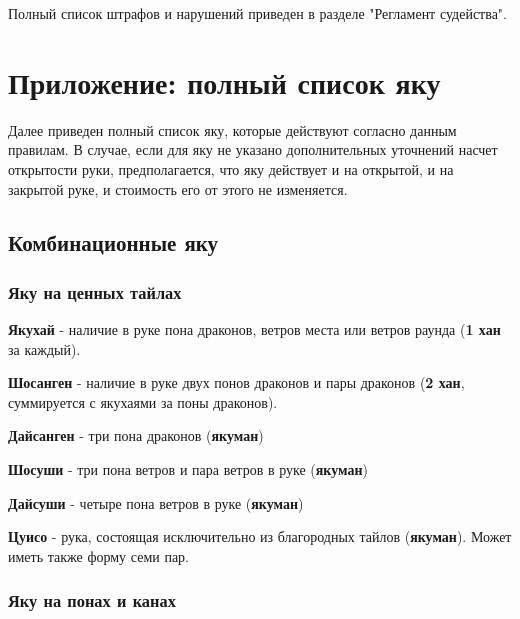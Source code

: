 Полный список штрафов и нарушений приведен в разделе "Регламент судейства".

\section{Приложение: полный список яку}

Далее приведен полный список яку, которые действуют согласно данным правилам. В случае, если для яку не указано дополнительных уточнений насчет открытости руки, предполагается, что яку действует и на открытой, и на закрытой руке, и стоимость его от этого не изменяется.

\subsection{Комбинационные яку}

\subsubsection{Яку на ценных тайлах}

\textbf{Якухай} - наличие в руке пона драконов, ветров места или ветров раунда (\textbf{1 хан} за каждый).

 \hfill {}

\textbf{Шосанген} - наличие в руке двух понов драконов и пары драконов (\textbf{2 хан}, суммируется с якухаями за поны драконов).

 \hfill {}

\textbf{Дайсанген} - три пона драконов (\textbf{якуман})

 \hfill {}

\textbf{Шосуши} - три пона ветров и пара ветров в руке (\textbf{якуман})

 \hfill {}

\textbf{Дайсуши} - четыре пона ветров в руке (\textbf{якуман})

 \hfill {}

\textbf{Цуисо} - рука, состоящая исключительно из благородных тайлов (\textbf{якуман}). Может иметь также форму семи пар.

 \hfill {}

\subsubsection{Яку на понах и канах}

